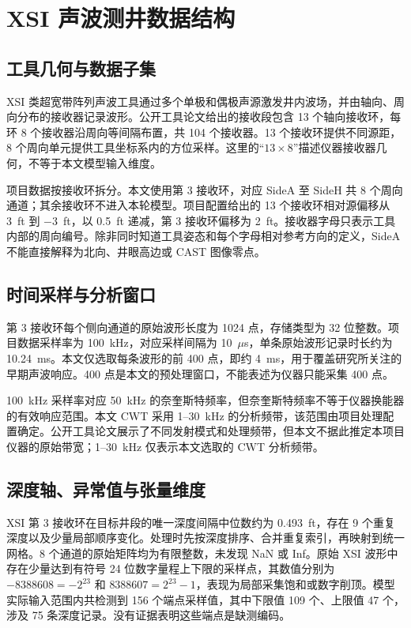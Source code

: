 \section{XSI 声波测井数据结构}

\subsection{工具几何与数据子集}

XSI 类超宽带阵列声波工具通过多个单极和偶极声源激发井内波场，并由轴向、周向分布的接收器记录波形。公开工具论文给出的接收段包含 13 个轴向接收环，每环 8 个接收器沿周向等间隔布置，共 104 个接收器\cite{Sun2016UltrabroadbandAcoustic}。13 个接收环提供不同源距，8 个周向单元提供工具坐标系内的方位采样。这里的“$13\times8$”描述仪器接收器几何，不等于本文模型输入维度。

项目数据按接收环拆分。本文使用第 3 接收环，对应 SideA 至 SideH 共 8 个周向通道；其余接收环不进入本轮模型。项目配置给出的 13 个接收环相对源偏移从 3~ft 到 $-3$~ft，以 0.5~ft 递减，第 3 接收环偏移为 2~ft。接收器字母只表示工具内部的周向编号。除非同时知道工具姿态和每个字母相对参考方向的定义，SideA 不能直接解释为北向、井眼高边或 CAST 图像零点\cite{Che2014PhasedArcReception,Che2017AzimuthalReceiver}。

\subsection{时间采样与分析窗口}

第 3 接收环每个侧向通道的原始波形长度为 1024 点，存储类型为 32 位整数。项目数据采样率为 100~kHz，对应采样间隔为 10~$\mu$s，单条原始波形记录时长约为 10.24~ms。本文仅选取每条波形的前 400 点，即约 4~ms，用于覆盖研究所关注的早期声波响应。400 点是本文的预处理窗口，不能表述为仪器只能采集 400 点。

100~kHz 采样率对应 50~kHz 的奈奎斯特频率，但奈奎斯特频率不等于仪器换能器的有效响应范围。本文 CWT 采用 1--30~kHz 的分析频带，该范围由项目处理配置确定。公开工具论文展示了不同发射模式和处理频带\cite{Sun2016UltrabroadbandAcoustic}，但本文不据此推定本项目仪器的原始带宽；1--30~kHz 仅表示本文选取的 CWT 分析频带。

\subsection{深度轴、异常值与张量维度}

XSI 第 3 接收环在目标井段的唯一深度间隔中位数约为 0.493~ft，存在 9 个重复深度以及少量局部顺序变化。处理时先按深度排序、合并重复索引，再映射到统一网格。8 个通道的原始矩阵均为有限整数，未发现 NaN 或 Inf。原始 XSI 波形中存在少量达到有符号 24 位数字量程上下限的采样点，其数值分别为 $-8388608=-2^{23}$ 和 $8388607=2^{23}-1$，表现为局部采集饱和或数字削顶。模型实际输入范围内共检测到 156 个端点采样值，其中下限值 109 个、上限值 47 个，涉及 75 条深度记录。没有证据表明这些端点是缺测编码。

